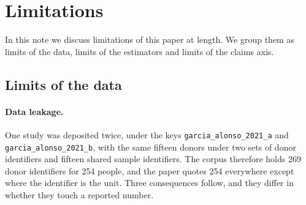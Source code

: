 %
%
%
%

\section{Limitations}
\label{note:limitations}

In this note we discuss limitations of this paper at length. We
group them as limits of the data, limits of the estimators and limits of
the claims axis.

\subsection{Limits of the data}

\paragraph{Data leakage.} One study was deposited
twice, under the keys \texttt{garcia\_alonso\_2021\_a} and
\texttt{garcia\_alonso\_2021\_b}, with the same fifteen donors under two
sets of donor identifiers and fifteen shared sample identifiers. The corpus
therefore holds 269 donor identifiers for 254 people, and the paper quotes
254 everywhere except where the identifier is the unit. Three consequences
follow, and they differ in whether they touch a reported number.

